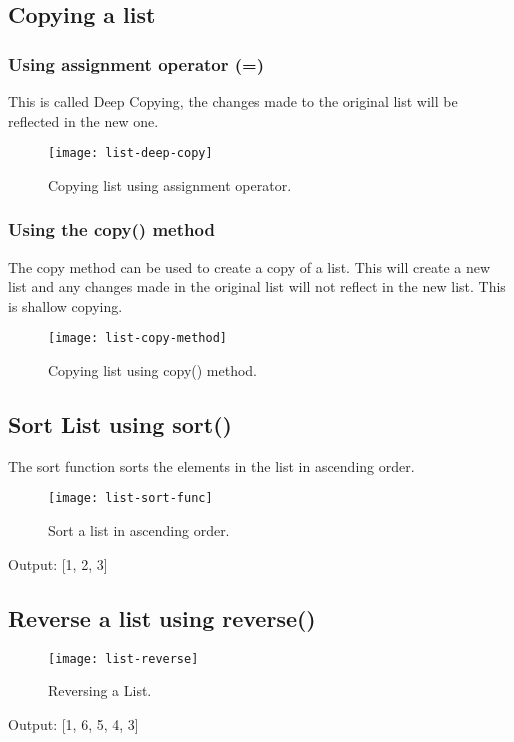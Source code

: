 \subsection{Copying a list}
\subsubsection{Using assignment operator (=)}
{\large This is called Deep Copying, the changes made to the original list will be reflected in the new one.}
\newpage

\begin{figure}[h]
	\centering
	\texttt{[image: list-deep-copy]}
	\caption{Copying list using assignment operator.}
	\label{fig:list-deep-copy}
\end{figure}

\subsubsection{Using the copy() method}
{\large The copy method can be used to create a copy of a list. This will create a new list and any changes made in the original list will not reflect in the new list. This is shallow copying.}
\newpage

\begin{figure}[h]
	\centering
	\texttt{[image: list-copy-method]}
	\caption{Copying list using copy() method.}
	\label{fig:list-shallow-copy}
\end{figure}

\subsection{Sort List using sort()}
The sort function sorts the elements in the list in ascending order.

\begin{figure}[h]
	\centering
	\texttt{[image: list-sort-func]}
	\caption{Sort a list in ascending order.}
	\label{fig:list-sort-func}
\end{figure}

Output: [1, 2, 3]

\subsection{Reverse a list using reverse()}

\begin{figure}[h]
	\centering
	\texttt{[image: list-reverse]}
	\caption{Reversing a List.}
	\label{fig:list-reverse}
\end{figure}

Output: [1, 6, 5, 4, 3]